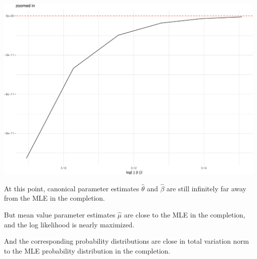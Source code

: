 \documentclass[
  ignorenonframetext,
]{beamer}
\begin{document}
\begin{frame}{}
\protect\hypertarget{section-11}{}
\includegraphics{week7_p2_files/figure-beamer/unnamed-chunk-10-1.pdf}
\end{frame}

\begin{frame}{}
\protect\hypertarget{section-12}{}
At this point, canonical parameter estimates \(\hat\theta\) and
\(\hat\beta\) are still infinitely far away from the MLE in the
completion.

\vspace{12pt}

But mean value parameter estimates \(\hat\mu\) are close to the MLE in
the completion, and the log likelihood is nearly maximized.

\vspace{12pt}

And the corresponding probability distributions are close in total
variation norm to the MLE probability distribution in the completion.
\end{frame}
\end{document}
